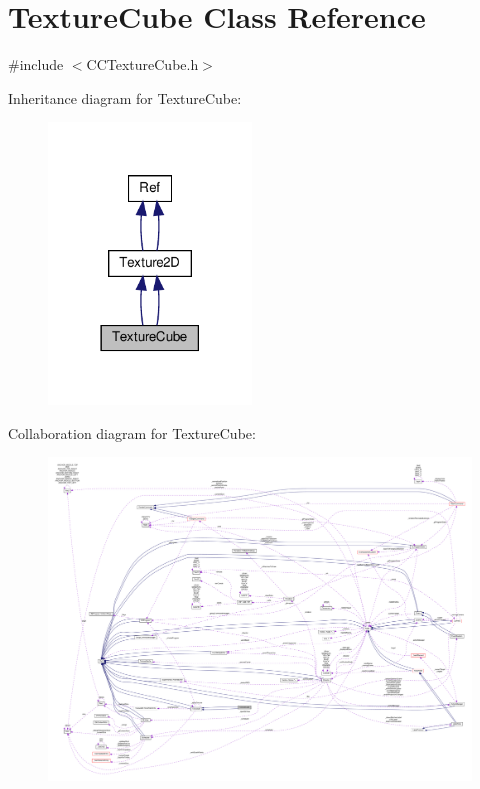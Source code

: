 \hypertarget{classTextureCube}{}\section{Texture\+Cube Class Reference}
\label{classTextureCube}


{\ttfamily \#include $<$C\+C\+Texture\+Cube.\+h$>$}



Inheritance diagram for Texture\+Cube\+:
\nopagebreak
\begin{figure}[H]
\begin{center}
\leavevmode
\includegraphics[width=153pt]{classTextureCube__inherit__graph}
\end{center}
\end{figure}


Collaboration diagram for Texture\+Cube\+:
\nopagebreak
\begin{figure}[H]
\begin{center}
\leavevmode
\includegraphics[width=350pt]{classTextureCube__coll__graph}
\end{center}
\end{figure}

